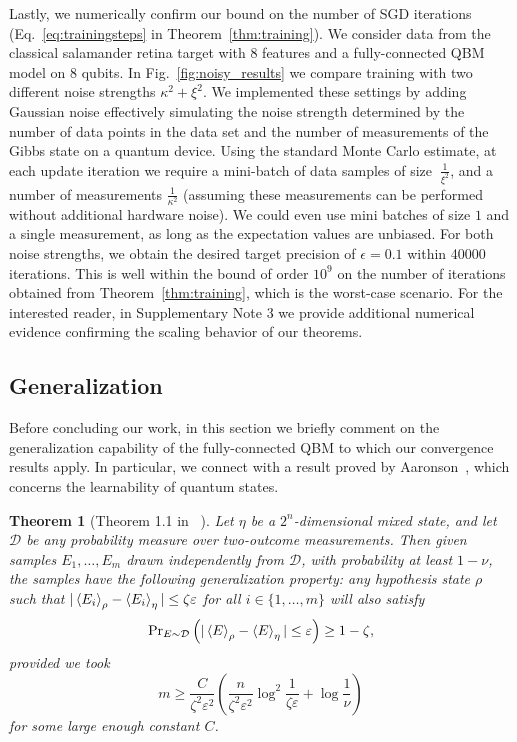 \documentclass[
    reprint,
    aps,
    prx,
    longbibliography
]{revtex4-2}
\newtheorem{theorem}{Theorem}
\begin{document}
Lastly, we numerically confirm our bound on the number of SGD iterations (Eq.~\eqref{eq:trainingsteps} in Theorem~\ref{thm:training}). We consider data from the classical salamander retina target with $8$ features and a fully-connected QBM model on $8$ qubits. 
In Fig.~\ref{fig:noisy_results} we compare training with two different noise strengths $\kappa^2+\xi^2$. We implemented these settings by adding Gaussian noise effectively simulating the noise strength determined by the number of data points in the data set and the number of measurements of the Gibbs state on a quantum device. Using the standard Monte Carlo estimate, at each update iteration we require a mini-batch of data samples of size $~\frac{1}{\xi^2}$, and a number of measurements $\frac{1}{\kappa^2}$ (assuming these measurements can be performed without additional hardware noise). We could even use mini batches of size $1$ and a single measurement, as long as the expectation values are unbiased. For both noise strengths, we obtain the desired target precision of $\epsilon=0.1$ within 40000 iterations. This is well within the bound of order $10^9$ on the number of iterations obtained from Theorem~\ref{thm:training}, which is the worst-case scenario. For the interested reader, in Supplementary Note 3 we provide additional numerical evidence confirming the scaling behavior of our theorems.

\subsection*{Generalization}

Before concluding our work, in this section we briefly comment on the generalization capability of the fully-connected QBM to which our convergence results apply. In particular, we connect with a result proved by Aaronson~\cite{Aaronson_2007}, which concerns the learnability of quantum states.

\begin{theorem}[Theorem 1.1 in ~\cite{Aaronson_2007}]
\label{thm:occams}
Let $\eta$ be a $2^n$-dimensional mixed state, and let $\mathcal{D}$ be any probability measure over two-outcome measurements. Then given samples
$E_1, \dots , E_m$ drawn independently from $\mathcal{D}$, with probability at least $1 - \nu$, the samples have the following generalization property: any hypothesis state $\rho$ such that $| \expval{E_i}_\rho - \expval{E_i}_\eta | \leq \zeta\varepsilon$ for all $i \in \{1, \dots, m\}$ will also satisfy
\begin{equation}
        \mathrm{Pr}_{E\sim \mathcal{D}} \left( |\expval{E}_\rho - \expval{E}_\eta |\leq \varepsilon\right) \geq 1 - \zeta,
\end{equation}
provided we took
\begin{equation}
\label{eq:m_ops}
    m\geq \frac{C}{\zeta^2 \varepsilon^2}\left(\frac{n}{\zeta^2 \varepsilon^2}\log^2 \frac{1}{\zeta\varepsilon} + \log \frac{1}{\nu} \right)
\end{equation}
for some large enough constant $C$. 
\end{theorem}
\end{document}
